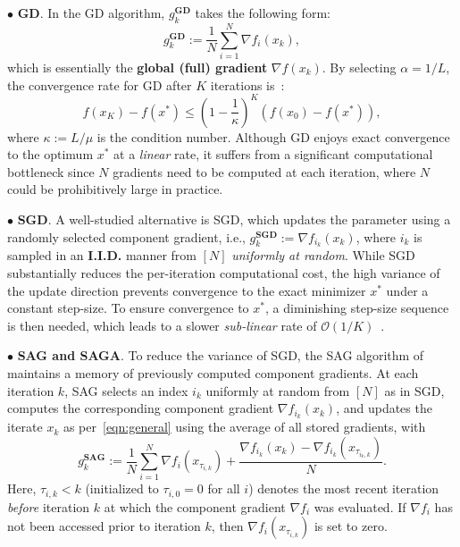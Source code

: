 \documentclass{article}
\theoremstyle{plain}
\theoremstyle{definition}
\newcommand{\cO}{\mathcal{O}}
\newcommand{\bigo}[1]{\cO\left( #1\right)}
\newcommand{\paren}[1]{\left( #1\right)}
\begin{document}
$\bullet$ \textbf{GD}. In the GD algorithm, $g_k^{\textbf{GD}}$ takes the following form:  
\begin{equation}
g_k^{\textbf{GD}}:=\frac{1}{N}\sum_{i=1}^N \nabla f_i(x_k),\label{eqn:GD}
\end{equation}
which is essentially the \textbf{global (full) gradient} $\nabla f(x_k)$. By selecting $\alpha=1/L$, the convergence rate for GD after $K$ iterations is~\cite{bubeck2015convex}: 
\begin{equation}
    f(x_K) - f(x^*) \leq \paren{1-\frac{1}{\kappa}}^K \paren{f(x_0) - f(x^*)},\label{eqn:rate_GD}
\end{equation}
where $\kappa:=L/\mu$ is the condition number. Although GD enjoys exact convergence to the optimum $x^*$ at a \textit{linear} rate, it suffers from a significant computational bottleneck since $N$ gradients need to be computed at each iteration, where $N$ could be prohibitively large in practice.

$\bullet$ \textbf{SGD}. A well-studied alternative is SGD, which updates the parameter using a randomly selected component gradient, i.e., $g_k^\textbf{SGD}:= \nabla f_{i_k}(x_k)$, where $i_k$ is sampled in an \textbf{I.I.D.} manner from $[N]$ \textit{uniformly at random}. While SGD substantially reduces the per-iteration computational cost, the high variance of the update direction prevents convergence to the exact minimizer $x^*$ under a constant step-size. To ensure convergence to $x^*$, a diminishing step-size sequence is then needed, which leads to a slower \textit{sub-linear} rate of $\bigo{1/K}$~\cite{bubeck2015convex, moulines2011non}.

$\bullet$ \textbf{SAG and SAGA}. To reduce the variance of SGD, the SAG algorithm of~\citet{SAG} maintains a memory of previously computed component gradients. At each iteration $k$, SAG selects an index $i_k$ uniformly at random from $[N]$ as in SGD, computes the corresponding component gradient $\nabla f_{i_k}(x_k)$, and updates the iterate $x_k$ as per~\eqref{eqn:general} using the average of all stored gradients, with 
\begin{equation}
g_k^{\textbf{SAG}}:=\frac{1}{N}\sum_{i=1}^N \nabla f_i(x_{\tau_{i,k}})+\frac{\nabla f_{i_k}(x_k)-\nabla f_{i_k}(x_{\tau_{i_k, k}})}{N}.\label{eqn:SAG}
\end{equation}
Here, $\tau_{i,k}<k$ (initialized to $\tau_{i,0}=0$ for all $i$) denotes the most recent iteration \textit{before} iteration $k$ at which the component gradient $\nabla f_i$ was evaluated. If $\nabla f_i$ has not been accessed prior to iteration $k$, then $\nabla f_i(x_{\tau_{i,k}})$ is set to zero.
\end{document}
